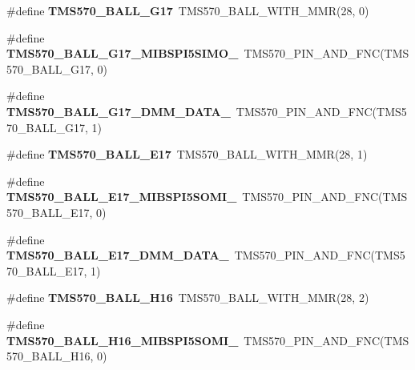 \begin{DoxyCompactItemize}
\#define {\bfseries T\+M\+S570\+\_\+\+B\+A\+L\+L\+\_\+\+G17}~T\+M\+S570\+\_\+\+B\+A\+L\+L\+\_\+\+W\+I\+T\+H\+\_\+\+M\+MR(28, 0)
\item 
\mbox{\label{tms570ls3137zwt-pins_8h_a8879a854b5a596297039a8c38f7da7f0}} 
\#define {\bfseries T\+M\+S570\+\_\+\+B\+A\+L\+L\+\_\+\+G17\+\_\+\+M\+I\+B\+S\+P\+I5\+S\+I\+M\+O\+\_}~T\+M\+S570\+\_\+\+P\+I\+N\+\_\+\+A\+N\+D\+\_\+\+F\+NC(T\+M\+S570\+\_\+\+B\+A\+L\+L\+\_\+\+G17, 0)
\item 
\mbox{\label{tms570ls3137zwt-pins_8h_acf90932857f094d40ba51a2a59d99a3d}} 
\#define {\bfseries T\+M\+S570\+\_\+\+B\+A\+L\+L\+\_\+\+G17\+\_\+\+D\+M\+M\+\_\+\+D\+A\+T\+A\+\_}~T\+M\+S570\+\_\+\+P\+I\+N\+\_\+\+A\+N\+D\+\_\+\+F\+NC(T\+M\+S570\+\_\+\+B\+A\+L\+L\+\_\+\+G17, 1)
\item 
\mbox{\label{tms570ls3137zwt-pins_8h_a30ad357c688c96a043e564f5d2932016}} 
\#define {\bfseries T\+M\+S570\+\_\+\+B\+A\+L\+L\+\_\+\+E17}~T\+M\+S570\+\_\+\+B\+A\+L\+L\+\_\+\+W\+I\+T\+H\+\_\+\+M\+MR(28, 1)
\item 
\mbox{\label{tms570ls3137zwt-pins_8h_a88beeaf38df2d975fdce8310e1e0310a}} 
\#define {\bfseries T\+M\+S570\+\_\+\+B\+A\+L\+L\+\_\+\+E17\+\_\+\+M\+I\+B\+S\+P\+I5\+S\+O\+M\+I\+\_}~T\+M\+S570\+\_\+\+P\+I\+N\+\_\+\+A\+N\+D\+\_\+\+F\+NC(T\+M\+S570\+\_\+\+B\+A\+L\+L\+\_\+\+E17, 0)
\item 
\mbox{\label{tms570ls3137zwt-pins_8h_a308676422069d31a54e289eb8e391e11}} 
\#define {\bfseries T\+M\+S570\+\_\+\+B\+A\+L\+L\+\_\+\+E17\+\_\+\+D\+M\+M\+\_\+\+D\+A\+T\+A\+\_}~T\+M\+S570\+\_\+\+P\+I\+N\+\_\+\+A\+N\+D\+\_\+\+F\+NC(T\+M\+S570\+\_\+\+B\+A\+L\+L\+\_\+\+E17, 1)
\item 
\mbox{\label{tms570ls3137zwt-pins_8h_a52f1f52aeddf4ae40e61a4c47a83fd1a}} 
\#define {\bfseries T\+M\+S570\+\_\+\+B\+A\+L\+L\+\_\+\+H16}~T\+M\+S570\+\_\+\+B\+A\+L\+L\+\_\+\+W\+I\+T\+H\+\_\+\+M\+MR(28, 2)
\item 
\mbox{\label{tms570ls3137zwt-pins_8h_a03157d7937fa49749dfae348cb1ecf2a}} 
\#define {\bfseries T\+M\+S570\+\_\+\+B\+A\+L\+L\+\_\+\+H16\+\_\+\+M\+I\+B\+S\+P\+I5\+S\+O\+M\+I\+\_}~T\+M\+S570\+\_\+\+P\+I\+N\+\_\+\+A\+N\+D\+\_\+\+F\+NC(T\+M\+S570\+\_\+\+B\+A\+L\+L\+\_\+\+H16, 0)

\end{DoxyCompactItemize}
